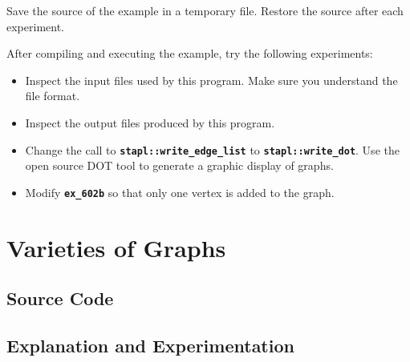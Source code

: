 \documentclass{report}
\begin{document}
Save the source of the example in a temporary file.
Restore the source after each experiment.

After compiling and executing the example, try the following experiments:
\begin{itemize}
\item
Inspect the input files used by this program.  Make sure you understand
the file format.
\item
Inspect the output files produced by this program.
\item
Change the call to \texttt{{\bf stapl::write\_edge\_list}} to
\texttt{{\bf stapl::write\_dot}}.  Use the open source DOT tool to generate
a graphic display of graphs.
\item  
Modify \texttt{{\bf ex\_602b}} so that only one vertex is added to the graph.
\end{itemize}


\pagebreak
\section{Varieties of Graphs}

\subsection{Source Code}



\subsection{Explanation and Experimentation}
\end{document}

